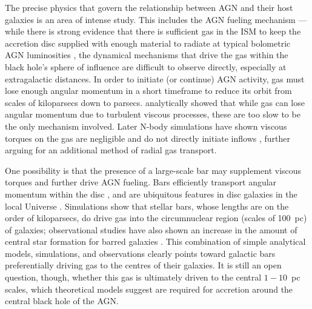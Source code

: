 The precise physics that govern the relationship between AGN and their host galaxies is an area of intense study. This includes the AGN fueling mechanism --- while there is strong evidence that there is sufficient gas in the ISM to keep the accretion disc supplied with enough material to radiate at typical bolometric AGN luminosities \citep{Shlosman1989,Shlosman1990}, the dynamical mechanisms that drive the gas within the black hole's sphere of influence are difficult to observe directly, especially at extragalactic distances. In order to initiate (or continue) AGN activity, gas must lose enough angular momentum in a short timeframe to reduce its orbit from scales of kiloparsecs down to parsecs. \citet{Shlosman1989} analytically showed that while gas can lose angular momentum due to turbulent viscous processes, these are too slow to be the only mechanism involved. Later N-body simulations have shown viscous torques on the gas are negligible and do not directly initiate inflows \citep{Bournaud2005}, further arguing for an additional method of radial gas transport. 

One possibility is that the presence of a large-scale bar may supplement viscous torques and further drive AGN fueling. Bars efficiently transport angular momentum within the disc \citep{Athanassoula2003,Kormendy2004}, and are ubiquitous features in disc galaxies in the local Universe \citep{Eskridge2000,Laurikainen2004,MenendezDelmestre2007a,Masters2011,Cheung2013}. Simulations \citep{Athanassoula1992,Friedli1993,Ann2005} show that stellar bars, whose lengths are on the order of kiloparsecs, do drive gas into the circumnuclear region (scales of 100~pc) of galaxies; observational studies have also shown an increase in the amount of central star formation for barred galaxies \citep{Ellison2011}. This combination of simple analytical models, simulations, and observations clearly points toward galactic bars preferentially driving gas to the centres of their galaxies. It is still an open question, though, whether this gas is ultimately driven to the central $1-10$~pc scales, which theoretical models suggest are required for accretion around the central black hole of the AGN.


